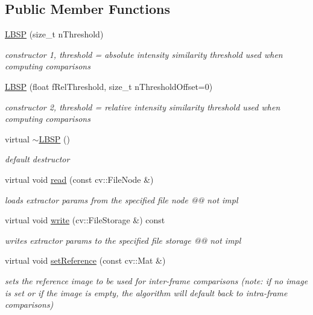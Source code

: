 \subsection*{Public Member Functions}
\begin{DoxyCompactItemize}
\item 
\mbox{\hyperlink{class_l_b_s_p_ae8297d81cf95b0e5333bf2e88b396a23}{L\+B\+SP}} (size\+\_\+t n\+Threshold)
\begin{DoxyCompactList}\small\item\em constructor 1, threshold = absolute intensity \textquotesingle{}similarity\textquotesingle{} threshold used when computing comparisons \end{DoxyCompactList}\item 
\mbox{\hyperlink{class_l_b_s_p_ab702ec2748fc5bac6e258370a089c270}{L\+B\+SP}} (float f\+Rel\+Threshold, size\+\_\+t n\+Threshold\+Offset=0)
\begin{DoxyCompactList}\small\item\em constructor 2, threshold = relative intensity \textquotesingle{}similarity\textquotesingle{} threshold used when computing comparisons \end{DoxyCompactList}\item 
virtual \mbox{\hyperlink{class_l_b_s_p_ad1a391995cbb0cfbb7289c73a6d37bc6}{$\sim$\+L\+B\+SP}} ()
\begin{DoxyCompactList}\small\item\em default destructor \end{DoxyCompactList}\item 
virtual void \mbox{\hyperlink{class_l_b_s_p_abd44c9e34e9a3b10ca1f08e32cc7f2fa}{read}} (const cv\+::\+File\+Node \&)
\begin{DoxyCompactList}\small\item\em loads extractor params from the specified file node @@ not impl \end{DoxyCompactList}\item 
virtual void \mbox{\hyperlink{class_l_b_s_p_a8a669d927653d7ba62c4097b306e0d5a}{write}} (cv\+::\+File\+Storage \&) const
\begin{DoxyCompactList}\small\item\em writes extractor params to the specified file storage @@ not impl \end{DoxyCompactList}\item 
virtual void \mbox{\hyperlink{class_l_b_s_p_a0d35c4022d72d62e90b44507f7a979bf}{set\+Reference}} (const cv\+::\+Mat \&)
\begin{DoxyCompactList}\small\item\em sets the \textquotesingle{}reference\textquotesingle{} image to be used for inter-\/frame comparisons (note\+: if no image is set or if the image is empty, the algorithm will default back to intra-\/frame comparisons) \end{DoxyCompactList}\item 

\end{DoxyCompactItemize}
